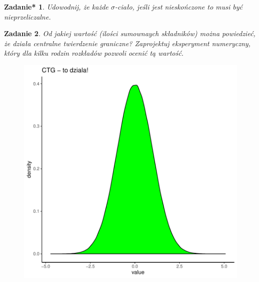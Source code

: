 \documentclass{mwart}
\newtheorem{zd}{Zadanie}
\newtheorem{zdt}[zd]{Zadanie*}
\begin{document}
\begin{zdt}
Udowodnij, że każde $\sigma$-ciało, jeśli jest nieskończone to musi być nieprzeliczalne.
\end{zdt}

\begin{zd}
Od jakiej wartość (ilości sumownaych składników) można powiedzieć, że działa centralne twierdzenie graniczne? Zaprojektuj eksperyment numeryczny, który dla kilku rodzin rozkładów pozwoli ocenić tą wartość.

\begin{figure}
\includegraphics{Zestaw1_PS_2020-004}
\end{figure}
\end{zd}

\end{document}
